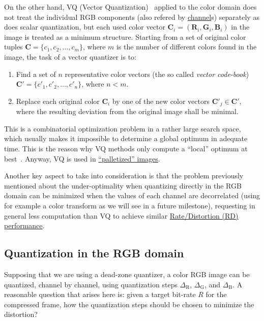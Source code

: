 On the other hand, VQ (Vector
Quantization)~\cite{vruiz__vector_quantization} applied to the color
domain does not treat the individual RGB components (also refered by
\href{https://en.wikipedia.org/wiki/Color_image}{channel}s) separately
as does scalar quantization, but each used color vector ${\mathbf C}_i
= ({\mathbf R}_i, {\mathbf G}_i, {\mathbf B}_i )$ in the image is
treated as a minimum structure. Starting from a set of original color
tuples ${\mathbf C} = \{c_1, c_2, \ldots ,c_m\}$, where $m$ is the
number of different colors found in the image, the task of a vector
quantizer is to:
\begin{enumerate}
\item Find a set of $n$ representative color vectors (the so called
  \emph{vector code-book}) ${\mathbf C}' = \{c'_1, c'_2 ,\ldots , c'_n
  \}$, where $n < m$.
\item Replace each original color ${\mathbf C}_i$ by one of the new
  color vectors ${\mathbf C}'_j\in {\mathbf C}'$, where the resulting
  deviation from the original image shall be minimal.
\end{enumerate}

This is a combinatorial optimization problem in a rather large search
space, which usually makes it impossible to determine a global optimum
in adequate time. This is the reason why VQ methods only compute a
``local'' optimum at best~\cite{burger2016digital}. Anyway, VQ is used
in
\href{https://en.wikipedia.org/wiki/Palette_(computing)}{``palletized''
  images}.
  
Another key aspect to take into consideration is that the problem
previously mentioned about the under-optimality when quantizing
directly in the RGB domain can be minimized when the values of each
channel are decorrelated (using for example a color transform as we
will see in a future milestone), requesting in general less
computation than VQ to achieve similar
\href{https://en.wikipedia.org/wiki/Rate-distortion_theory}{Rate/Distortion
  (RD) performance}.


\subsection{Quantization in the RGB domain}

Supposing that we are using a dead-zone quantizer, a color RGB image
can be quantized, channel by channel, using quantization steps
$\Delta_{\text{R}}$, $\Delta_{\text{G}}$, and $\Delta_{\text{B}}$. A
reasonable question that arises here is: given a target bit-rate $R$
for the compressed frame, how the quantization steps should be chosen
to minimize the distortion?

